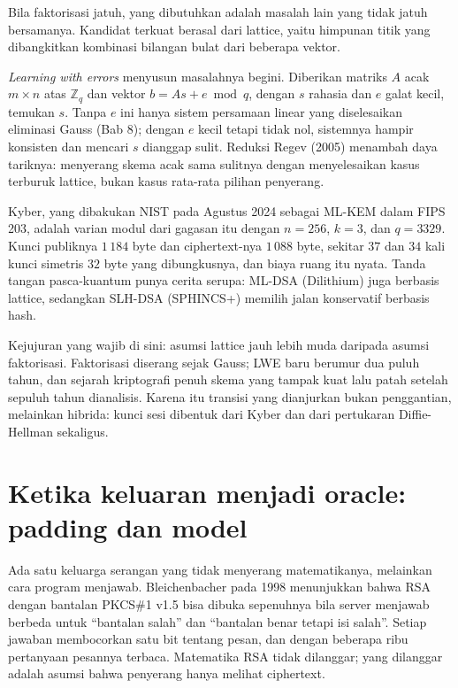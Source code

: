 Bila faktorisasi jatuh, yang dibutuhkan adalah masalah lain yang tidak jatuh bersamanya.
Kandidat terkuat berasal dari lattice, yaitu himpunan titik yang dibangkitkan kombinasi bilangan
bulat dari beberapa vektor.

\emph{Learning with errors} menyusun masalahnya begini. Diberikan matriks $A$ acak
$m\times n$ atas $\mathbb{Z}_q$ dan vektor $b=As+e\bmod q$, dengan $s$ rahasia dan $e$ galat
kecil, temukan $s$. Tanpa $e$ ini hanya sistem persamaan linear yang diselesaikan eliminasi
Gauss (Bab 8); dengan $e$ kecil tetapi tidak nol, sistemnya hampir konsisten dan mencari $s$
dianggap sulit. Reduksi Regev (2005) menambah daya tariknya: menyerang skema acak sama sulitnya
dengan menyelesaikan kasus terburuk lattice, bukan kasus rata-rata pilihan penyerang.

Kyber, yang dibakukan NIST pada Agustus 2024 sebagai ML-KEM dalam FIPS 203, adalah varian modul
dari gagasan itu dengan $n=256$, $k=3$, dan $q=3329$. Kunci publiknya $1\,184$ byte dan
ciphertext-nya $1\,088$ byte, sekitar $37$ dan $34$ kali kunci simetris $32$ byte yang
dibungkusnya, dan biaya ruang itu nyata. Tanda tangan pasca-kuantum punya cerita serupa:
ML-DSA (Dilithium) juga berbasis lattice, sedangkan SLH-DSA (SPHINCS+) memilih jalan
konservatif berbasis hash.

Kejujuran yang wajib di sini: asumsi lattice jauh lebih muda daripada asumsi faktorisasi.
Faktorisasi diserang sejak Gauss; LWE baru berumur dua puluh tahun, dan sejarah kriptografi
penuh skema yang tampak kuat lalu patah setelah sepuluh tahun dianalisis. Karena itu transisi
yang dianjurkan bukan penggantian, melainkan hibrida: kunci sesi dibentuk dari Kyber dan dari
pertukaran Diffie-Hellman sekaligus.

\section{Ketika keluaran menjadi oracle: padding dan model}

Ada satu keluarga serangan yang tidak menyerang matematikanya, melainkan cara program menjawab.
Bleichenbacher pada 1998 menunjukkan bahwa RSA dengan bantalan PKCS\#1 v1.5 bisa dibuka
sepenuhnya bila server menjawab berbeda untuk ``bantalan salah'' dan ``bantalan benar tetapi isi
salah''. Setiap jawaban membocorkan satu bit tentang pesan, dan dengan beberapa ribu pertanyaan
pesannya terbaca. Matematika RSA tidak dilanggar; yang dilanggar adalah asumsi bahwa penyerang
hanya melihat ciphertext.

